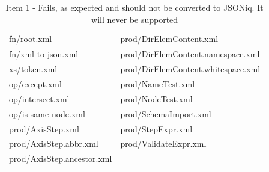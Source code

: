 \begin{table}[h!]
\begin{tabular}{|l|l|}
		fn/root.xml                     & prod/DirElemContent.xml              \\
		fn/xml-to-json.xml              & prod/DirElemContent.namespace.xml    \\
		xs/token.xml                    & prod/DirElemContent.whitespace.xml   \\
		op/except.xml                   & prod/NameTest.xml                    \\
		op/intersect.xml                & prod/NodeTest.xml                    \\
		op/is-same-node.xml             & prod/SchemaImport.xml                \\
		prod/AxisStep.xml               & prod/StepExpr.xml                    \\
		prod/AxisStep.abbr.xml          & prod/ValidateExpr.xml                \\
		prod/AxisStep.ancestor.xml      &                                      \\
		\hline
	\end{tabular}
	\caption{Item 1 - Fails, as expected and should not be converted to JSONiq. It will never be supported}
	\label{tab:Phase3_Item1}
\end{table}

